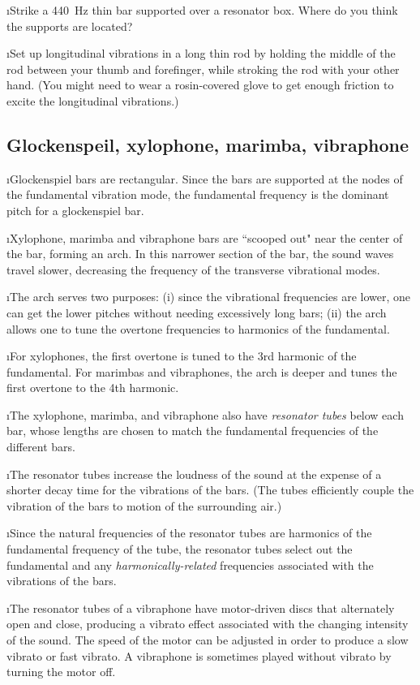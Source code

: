 \i \demo Strike a 440~Hz thin bar supported over
a resonator box.
Where do you think the supports are located?

\i \demo Set up longitudinal vibrations in a long
thin rod by holding the middle of the rod between
your thumb and forefinger, while stroking the rod
with your other hand.
(You might need to wear a rosin-covered glove to
get enough friction to excite the longitudinal 
vibrations.)

\ei
\subsection{Glockenspeil, xylophone, marimba, vibraphone}
\bi

\i Glockenspiel bars are rectangular.
Since the bars are supported at the nodes of the 
fundamental vibration mode, the fundamental frequency 
is the dominant pitch for a glockenspiel bar.

\i Xylophone, marimba and vibraphone bars are 
``scooped out" near the center of the bar, 
forming an arch.
In this narrower section of the bar, the sound 
waves travel slower, decreasing the frequency of 
the transverse vibrational modes.

\i The arch serves two purposes:
(i) since the vibrational frequencies are lower,
one can get the lower pitches without needing
excessively long bars;
(ii) the arch allows one to tune the overtone
frequencies to harmonics of the fundamental.

\i For xylophones, the first overtone is tuned
to the 3rd harmonic of the fundamental.
For marimbas and vibraphones, the arch is 
deeper and tunes the first overtone to the 
4th harmonic.

\i The xylophone, marimba, and vibraphone also
have {\em resonator tubes} below each bar, whose 
lengths are chosen to match the fundamental 
frequencies of the different bars.

\i The resonator tubes increase the loudness
of the sound at the expense of a
shorter decay time for the vibrations of the bars.
(The tubes efficiently couple the vibration of the
bars to motion of the surrounding air.)

\i Since the natural frequencies of the 
resonator tubes are harmonics of the fundamental
frequency of the tube, the resonator tubes select out 
the fundamental and any {\em harmonically-related} 
frequencies associated with the vibrations of the bars.
 
\i The resonator tubes of a vibraphone have
motor-driven discs that alternately open and
close, producing a vibrato effect associated 
with the changing intensity of the sound.
The speed of the motor can be adjusted in order
to produce a slow vibrato or fast vibrato.
A vibraphone is sometimes played without vibrato
by turning the motor off.

